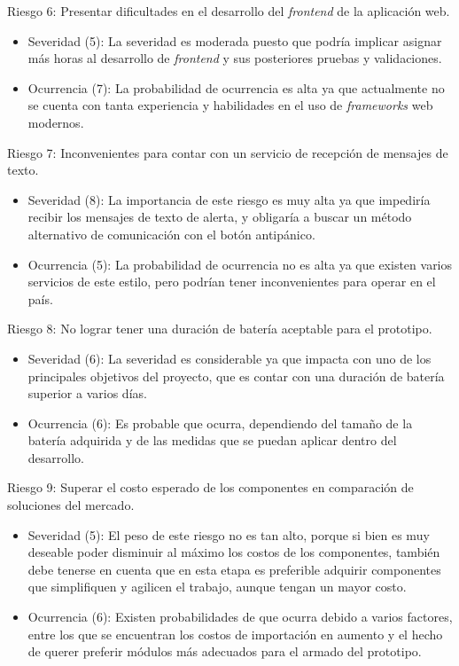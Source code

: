 \documentclass[
11pt, %
]{charter}
\begin{document}
Riesgo 6: Presentar dificultades en el desarrollo del \textit{frontend} de la aplicación web.
\begin{itemize}
	\item Severidad (5): La severidad es moderada puesto que podría implicar asignar más horas al desarrollo de \textit{frontend} y sus posteriores pruebas y validaciones.
	\item Ocurrencia (7): La probabilidad de ocurrencia es alta ya que actualmente no se cuenta con tanta experiencia y habilidades en el uso de \textit{frameworks} web modernos.
\end{itemize}

Riesgo 7: Inconvenientes para contar con un servicio de recepción de mensajes de texto.
\begin{itemize}
	\item Severidad (8): La importancia de este riesgo es muy alta ya que impediría recibir los mensajes de texto de alerta, y obligaría a buscar un método alternativo de comunicación con el botón antipánico.
	\item Ocurrencia (5): La probabilidad de ocurrencia no es alta ya que existen varios servicios de este estilo, pero podrían tener inconvenientes para operar en el país.
\end{itemize}

Riesgo 8: No lograr tener una duración de batería aceptable para el prototipo.
\begin{itemize}
	\item Severidad (6): La severidad es considerable ya que impacta con uno de los principales objetivos del proyecto, que es contar con una duración de batería superior a varios días.
	\item Ocurrencia (6): Es probable que ocurra, dependiendo del tamaño de la batería adquirida y de las medidas que se puedan aplicar dentro del desarrollo.
\end{itemize}

Riesgo 9: Superar el costo esperado de los componentes en comparación de soluciones del mercado.
\begin{itemize}
	\item Severidad (5): El peso de este riesgo no es tan alto, porque si bien es muy deseable poder disminuir al máximo los costos de los componentes, también debe tenerse en cuenta que en esta etapa es preferible adquirir componentes que simplifiquen y agilicen el trabajo, aunque tengan un mayor costo.
	\item Ocurrencia (6): Existen probabilidades de que ocurra debido a varios factores, entre los que se encuentran los costos de importación en aumento y el hecho de querer preferir módulos más adecuados para el armado del prototipo.
\end{itemize}
\end{document}
